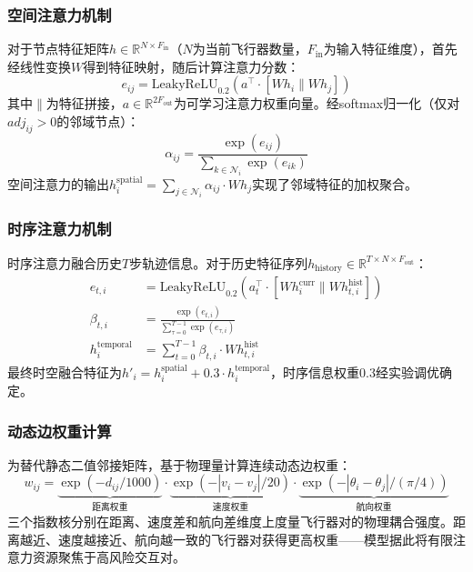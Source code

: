 \documentclass[12pt,a4paper,UTF8]{ctexart}
\begin{document}
\subsubsection{空间注意力机制}

对于节点特征矩阵$h \in \mathbb{R}^{N \times F_{\text{in}}}$（$N$为当前飞行器数量，$F_{\text{in}}$为输入特征维度），首先经线性变换$W$得到特征映射，随后计算注意力分数：
\begin{equation}
    e_{ij} = \text{LeakyReLU}_{0.2}\left(a^{\top} \cdot [Wh_i \parallel Wh_j]\right)
    \label{eq:spatial_attn}
\end{equation}
其中$\parallel$为特征拼接，$a \in \mathbb{R}^{2F_{\text{out}}}$为可学习注意力权重向量。经softmax归一化（仅对$adj_{ij} > 0$的邻域节点）：
\begin{equation}
    \alpha_{ij} = \frac{\exp(e_{ij})}{\sum_{k \in \mathcal{N}_i} \exp(e_{ik})}
    \label{eq:alpha}
\end{equation}
空间注意力的输出$h_i^{\text{spatial}} = \sum_{j \in \mathcal{N}_i} \alpha_{ij} \cdot Wh_j$实现了邻域特征的加权聚合。

\subsubsection{时序注意力机制}

时序注意力融合历史$T$步轨迹信息。对于历史特征序列$h_{\text{history}} \in \mathbb{R}^{T \times N \times F_{\text{out}}}$：
\begin{align}
    e_{t,i} &= \text{LeakyReLU}_{0.2}\left(a_t^{\top} \cdot [Wh_i^{\text{curr}} \parallel Wh_{t,i}^{\text{hist}}]\right) \label{eq:temporal_attn} \\
    \beta_{t,i} &= \frac{\exp(e_{t,i})}{\sum_{\tau=0}^{T-1} \exp(e_{\tau,i})} \label{eq:beta} \\
    h_i^{\text{temporal}} &= \sum_{t=0}^{T-1} \beta_{t,i} \cdot Wh_{t,i}^{\text{hist}} \label{eq:temporal_out}
\end{align}
最终时空融合特征为$h'_i = h_i^{\text{spatial}} + 0.3 \cdot h_i^{\text{temporal}}$，时序信息权重$0.3$经实验调优确定。

\subsubsection{动态边权重计算}

为替代静态二值邻接矩阵，基于物理量计算连续动态边权重：
\begin{equation}
    w_{ij} = \underbrace{\exp(-d_{ij}/1000)}_{\text{距离权重}} \cdot \underbrace{\exp(-|v_i - v_j|/20)}_{\text{速度权重}} \cdot \underbrace{\exp(-|\theta_i - \theta_j|/(\pi/4))}_{\text{航向权重}}
    \label{eq:edge_weight}
\end{equation}
三个指数核分别在距离、速度差和航向差维度上度量飞行器对的物理耦合强度。距离越近、速度越接近、航向越一致的飞行器对获得更高权重——模型据此将有限注意力资源聚焦于高风险交互对。
\end{document}
